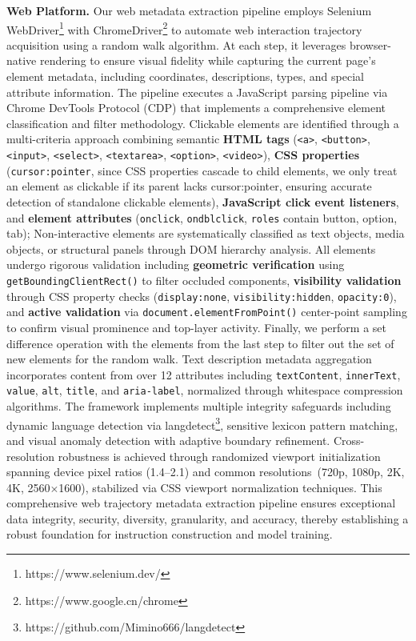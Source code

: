 \textbf{Web Platform.} 
Our web metadata extraction pipeline employs Selenium WebDriver\footnote{https://www.selenium.dev/} with ChromeDriver\footnote{https://www.google.cn/chrome} to automate web interaction trajectory acquisition using a random walk algorithm. At each step, it leverages browser-native rendering to ensure visual fidelity while capturing the current page's element metadata, including coordinates, descriptions, types, and special attribute information.
The pipeline executes a JavaScript parsing pipeline via Chrome DevTools Protocol (CDP) that implements a comprehensive element classification and filter methodology. Clickable elements are identified through a multi-criteria approach combining semantic \textbf{HTML tags} (\texttt{<a>}, \texttt{<button>}, \texttt{<input>}, \texttt{<select>}, \texttt{<textarea>}, \texttt{<option>}, \texttt{<video>}), \textbf{CSS properties} (\texttt{cursor:pointer}, since CSS properties cascade to child elements, we only treat an element as clickable if its parent lacks cursor:pointer, ensuring accurate detection of standalone clickable elements), \textbf{JavaScript click event listeners}, and \textbf{element attributes} (\texttt{onclick}, \texttt{ondblclick}, \texttt{roles} contain button, option, tab); Non-interactive elements are systematically classified as text objects, media objects, or structural panels through DOM hierarchy analysis. All elements undergo rigorous validation including \textbf{geometric verification} using \texttt{getBoundingClientRect()} to filter occluded components, \textbf{visibility validation} through CSS property checks (\texttt{display:none}, \texttt{visibility:hidden}, \texttt{opacity:0}), and \textbf{active validation} via \texttt{document.elementFromPoint()} center-point sampling to confirm visual prominence and top-layer activity. Finally, we perform a set difference operation with the elements from the last step to filter out the set of new elements for the random walk.
Text description metadata aggregation incorporates content from over 12 attributes including \texttt{textContent}, \texttt{innerText}, \texttt{value}, \texttt{alt}, \texttt{title}, and \texttt{aria-label}, normalized through whitespace compression algorithms. The framework implements multiple integrity safeguards including dynamic language detection via langdetect\footnote{https://github.com/Mimino666/langdetect}, sensitive lexicon pattern matching, and visual anomaly detection with adaptive boundary refinement. Cross-resolution robustness is achieved through randomized viewport initialization spanning device pixel ratios (1.4--2.1) and common resolutions~(720p, 1080p, 2K, 4K, 2560$\times$1600), stabilized via CSS viewport normalization techniques. This comprehensive web trajectory metadata extraction pipeline ensures exceptional data integrity, security, diversity, granularity, and accuracy, thereby establishing a robust foundation for instruction construction and model training.

